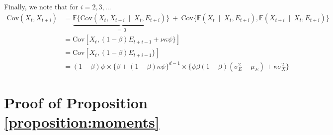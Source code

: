 \documentclass{article}
\begin{document}
Finally, we note that for $i = 2, 3, \dots$
\begin{align*}
\text{Cov}(X_t, X_{t + i}) & = \underbrace{\mathbb{E}\{\text{Cov}(X_t, X_{t + i} \ \mid \ X_t, E_{t + i})\}}_{= \ 0} \ + \ \text{Cov}\{\mathbb{E}(X_t \ \mid \ X_t, E_{t + i}), \mathbb{E}(X_{t + i} \ \mid \ X_t, E_{t + i})\}\\
& = \text{Cov}[X_t, (1 - \beta) E_{t + i - 1} + \nu\kappa\psi\}]\\
& = \text{Cov}[X_t, (1 - \beta) E_{t + i - 1}\}]\\
& = (1 - \beta)\psi\times \{\beta + (1 - \beta)\kappa\psi\}^{d - 1} \times \{\psi\beta(1 - \beta)(\sigma^2_E - \mu_E) + \kappa\sigma^2_X\}
\end{align*}


\section{Proof of Proposition \ref{proposition:moments}}
\end{document}
